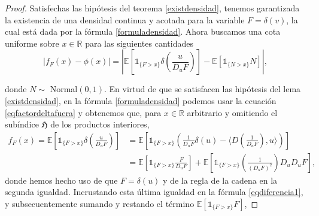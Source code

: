 \documentclass[letterpaper,twoside,12pt]{book}
\newcommand{\R}{\mathbb{R}}
\newcommand{\E}{\mathbb{E}}
\newcommand{\1}{\mathds{1}}
\newcommand{\abs}[1]{\left\lvert #1 \right\rvert}
\theoremstyle{definition}
\theoremstyle{definition}
\theoremstyle{remark}
\theoremstyle{definition}
\theoremstyle{definition}
\theoremstyle{definition}
\theoremstyle{definition}
\theoremstyle{definition}
\begin{document}
\begin{proof}
   Satisfechas las hipótesis del teorema \ref{existdensidad}, tenemos garantizada la existencia de una densidad continua y acotada para la variable $F=\delta(v)$, la cual está dada por la fórmula \eqref{formuladensidad}. Ahora buscamos una cota uniforme sobre $x\in \R$ para las siguientes cantidades
   \begin{equation}\label{eqdiferencia1}
   \abs{f_F(x)-\phi(x)}=\abs{\E\left[\1_{\{F>x\}}\delta\left(\frac{u}{D_uF}\right)\right]-\E\left[\1_{\{N>x\}}N\right]}, 
   \end{equation}
  
  donde $N\sim$ Normal$(0,1)$.
   En virtud de que se satisfacen las hipótesis del lema \ref{existdensidad}, en la fórmula \eqref{formuladensidad} podemos usar la ecuación \eqref{eqfactordeltafuera} y obtenemos que, para $x\in \R$ arbitrario y omitiendo el subíndice $\mathfrak{H}$ de los productos interiores,
   \begin{align*}
   f_F(x)=\E\left[\1_{\{F>x\}}\delta\left(\frac{u}{D_uF}\right)\right]&=\E\left[\1_{\{F>x\}}\left(\frac{1}{D_{u}F}\delta(u)-\Big\langle D \left(\frac{1}{D_{u}F}\right),u \Big\rangle \right)\right]\\
   &=\E\left[\1_{\{F>x\}}\frac{F}{D_{u}F}\right]+\E\left[\1_{\{F>x\}}\left(\frac{1}{\left(D_{u}F\right)^2}\right)D_{u}D_{u}F\right],
      \end{align*}
      donde hemos hecho uso de que $F=\delta(u)$ y de la regla de la cadena en la segunda igualdad.
  Incrustando esta última igualdad en la fórmula \eqref{eqdiferencia1}, y subsecuentemente sumando y restando el término $\E\left[\1_{\{F>x\}}F\right]$,
  

\end{proof}
\end{document}

